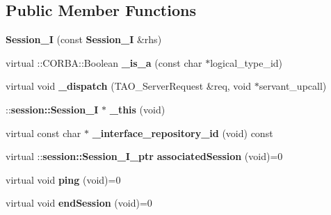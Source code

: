 \subsection*{Public Member Functions}
\begin{DoxyCompactItemize}
\item 
{\bfseries Session\+\_\+I} (const {\bf Session\+\_\+I} \&rhs)\label{classPOA__session_1_1Session__I_af57bebbd77edded3ca489a0731468613}

\item 
virtual \+::C\+O\+R\+B\+A\+::\+Boolean {\bfseries \+\_\+is\+\_\+a} (const char $\ast$logical\+\_\+type\+\_\+id)\label{classPOA__session_1_1Session__I_ac5aa298ed0a54528a80e9df51e225077}

\item 
virtual void {\bfseries \+\_\+dispatch} (T\+A\+O\+\_\+\+Server\+Request \&req, void $\ast$servant\+\_\+upcall)\label{classPOA__session_1_1Session__I_abbbd95d89deb620f81fecead0bc3d35a}

\item 
\+::{\bf session\+::\+Session\+\_\+I} $\ast$ {\bfseries \+\_\+this} (void)\label{classPOA__session_1_1Session__I_a641ff4159d79477bb4c85cd19aabf418}

\item 
virtual const char $\ast$ {\bfseries \+\_\+interface\+\_\+repository\+\_\+id} (void) const \label{classPOA__session_1_1Session__I_a6cc96ab756afd56841d876a7214e79f1}

\item 
virtual \+::{\bf session\+::\+Session\+\_\+\+I\+\_\+ptr} {\bfseries associated\+Session} (void)=0\label{classPOA__session_1_1Session__I_adc245df08b3ae8b2f25eb69b1cc8fb37}

\item 
virtual void {\bfseries ping} (void)=0\label{classPOA__session_1_1Session__I_a94d63d5632488be2b2f61b8a1217b15b}

\item 
virtual void {\bfseries end\+Session} (void)=0\label{classPOA__session_1_1Session__I_a429f1f69f377a6c35d13723033702837}

\end{DoxyCompactItemize}
